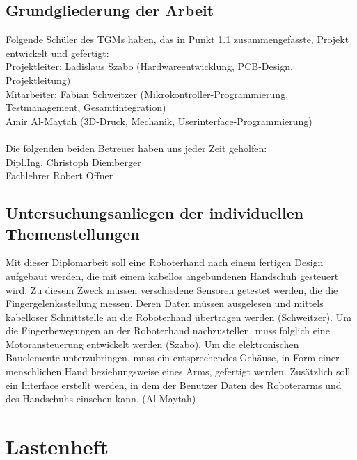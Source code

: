 \documentclass[11pt]{article}
\begin{document}
\subsection{Grundgliederung der Arbeit}
Folgende Schüler des TGMs haben, das in Punkt 1.1 zusammengefasste, Projekt entwickelt und gefertigt: \hfill \break
\\
Projektleiter:    Ladislaus Szabo (Hardwareentwicklung, PCB-Design, Projektleitung)\\
Mitarbeiter: Fabian Schweitzer (Mikrokontroller-Programmierung, Testmanagement, Gesamtintegration)\\
Amir Al-Maytah (3D-Druck, Mechanik, Userinterface-Programmierung) 
\\
\\
Die folgenden beiden Betreuer haben uns jeder Zeit geholfen:
\\
Dipl.Ing. Christoph Diemberger \\
Fachlehrer Robert Offner

\subsection{Untersuchungsanliegen der individuellen Themenstellungen}
Mit dieser Diplomarbeit soll eine Roboterhand nach einem fertigen Design aufgebaut werden,
die mit einem kabellos angebundenen Handschuh gesteuert wird. Zu diesem Zweck müssen
verschiedene Sensoren getestet werden, die die Fingergelenksstellung messen. Deren Daten
müssen ausgelesen und mittels kabelloser Schnittstelle an die Roboterhand übertragen werden
(Schweitzer). Um die Fingerbewegungen an der Roboterhand nachzustellen, muss folglich eine
Motoransteuerung entwickelt werden (Szabo). Um die elektronischen Bauelemente
unterzubringen, muss ein entsprechendes Gehäuse, in Form einer menschlichen Hand
beziehungsweise eines Arms, gefertigt werden. Zusätzlich soll ein Interface erstellt werden, in
dem der Benutzer Daten des Roboterarms und des Handschuhs einsehen kann. (Al-Maytah) \\

\hfill \break
\hfill \break
\hfill \break
\hfill \break
\hfill \break
\hfill \break
\hfill \break
\hfill \break

\section{Lastenheft}
\end{document}
